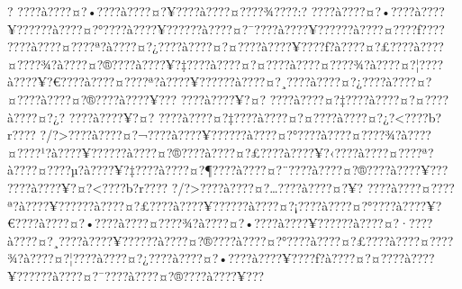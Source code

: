 \documentclass[11pt, openany]{book}
\begin{document}
{{{{{{{{{{{{{{{{{{{{{{{{{{{{{{{{{{{{{{{{{{{{{{{{{{{{{{{{{{{{{{{{{{{{{{{{{{{{{{{{{{{{{{{{{{{{{{{{{{{{{{{{{{{{{?
???\textbar{}?à???\textbar{}?¤?•???\textbar{}?à???\textbar{}?¤?¥???\textbar{}?à???\textbar{}?¤???\textbar{}?¾???\textbar{}?:?
???\textbar{}?à???\textbar{}?¤?•???\textbar{}?à???\textbar{}?¥?????\textbar{}?à???\textbar{}?¤?°???\textbar{}?à???\textbar{}?¥?????\textbar{}?à???\textbar{}?¤?¯???\textbar{}?à???\textbar{}?¥?????\textbar{}?à???\textbar{}?¤???\textbar{}?ƒ???\textbar{}?
???\textbar{}?à???\textbar{}?¤???\textbar{}?ª?à???\textbar{}?¤?¿???\textbar{}?à???\textbar{}?¤?¤???\textbar{}?à???\textbar{}?¥???\textbar{}?ƒ?à???\textbar{}?¤?£???\textbar{}?à???\textbar{}?¤???\textbar{}?¾?à???\textbar{}?¤?®???\textbar{}?à???\textbar{}?¥?‡???\textbar{}?à???\textbar{}?¤?¤???\textbar{}?à???\textbar{}?¤???\textbar{}?¾?à???\textbar{}?¤?¦???\textbar{}?à???\textbar{}?¥?€???\textbar{}?à???\textbar{}?¤???\textbar{}?ª?à???\textbar{}?¥?????\textbar{}?à???\textbar{}?¤?¸???\textbar{}?à???\textbar{}?¤?¿???\textbar{}?à???\textbar{}?¤?¤???\textbar{}?à???\textbar{}?¤?®???\textbar{}?à???\textbar{}?¥???
???\textbar{}?à???\textbar{}?¥?¤?
???\textbar{}?à???\textbar{}?¤?‡???\textbar{}?à???\textbar{}?¤?¤???\textbar{}?à???\textbar{}?¤?¿?
???\textbar{}?à???\textbar{}?¥?¤?
???\textbar{}?à???\textbar{}?¤?‡???\textbar{}?à???\textbar{}?¤?¤???\textbar{}?à???\textbar{}?¤?¿?\textless{}???\textbar{}?b?r???\textbar{}?
?/?\textgreater{}???\textbar{}?à???\textbar{}?¤?¬???\textbar{}?à???\textbar{}?¥?????\textbar{}?à???\textbar{}?¤?°???\textbar{}?à???\textbar{}?¤???\textbar{}?¾?à???\textbar{}?¤???\textbar{}?¹?à???\textbar{}?¥?????\textbar{}?à???\textbar{}?¤?®???\textbar{}?à???\textbar{}?¤?£???\textbar{}?à???\textbar{}?¥?‹???\textbar{}?à???\textbar{}?¤???\textbar{}?ª?à???\textbar{}?¤???\textbar{}?µ?à???\textbar{}?¥?‡???\textbar{}?à???\textbar{}?¤?¶???\textbar{}?à???\textbar{}?¤?¨???\textbar{}?à???\textbar{}?¤?®???\textbar{}?à???\textbar{}?¥???
???\textbar{}?à???\textbar{}?¥?¤?\textless{}???\textbar{}?b?r???\textbar{}?
?/?\textgreater{}???\textbar{}?à???\textbar{}?¤?\ldots{}???\textbar{}?à???\textbar{}?¤?¥?
???\textbar{}?à???\textbar{}?¤???\textbar{}?ª?à???\textbar{}?¥?????\textbar{}?à???\textbar{}?¤?£???\textbar{}?à???\textbar{}?¥?????\textbar{}?à???\textbar{}?¤?¡???\textbar{}?à???\textbar{}?¤?°???\textbar{}?à???\textbar{}?¥?€???\textbar{}?à???\textbar{}?¤?•???\textbar{}?à???\textbar{}?¤???\textbar{}?¾?à???\textbar{}?¤?•???\textbar{}?à???\textbar{}?¥?????\textbar{}?à???\textbar{}?¤?·???\textbar{}?à???\textbar{}?¤?¸???\textbar{}?à???\textbar{}?¥?????\textbar{}?à???\textbar{}?¤?®???\textbar{}?à???\textbar{}?¤?°???\textbar{}?à???\textbar{}?¤?£???\textbar{}?à???\textbar{}?¤???\textbar{}?¾?à???\textbar{}?¤?¦???\textbar{}?à???\textbar{}?¤?¿???\textbar{}?à???\textbar{}?¤?•???\textbar{}?à???\textbar{}?¥???\textbar{}?ƒ?à???\textbar{}?¤?¤???\textbar{}?à???\textbar{}?¥?????\textbar{}?à???\textbar{}?¤?¯???\textbar{}?à???\textbar{}?¤?®???\textbar{}?à???\textbar{}?¥???
}}}}}}}}}}}}}}}}}}}}}}}}}}}}}}}}}}}}}}}}}}}}}}}}}}}}}}}}}}}}}}}}}}}}}}}}}}}}}}}}}}}}}}}}}}}}}}}}}}}}}}}}}}}}}
\end{document}
